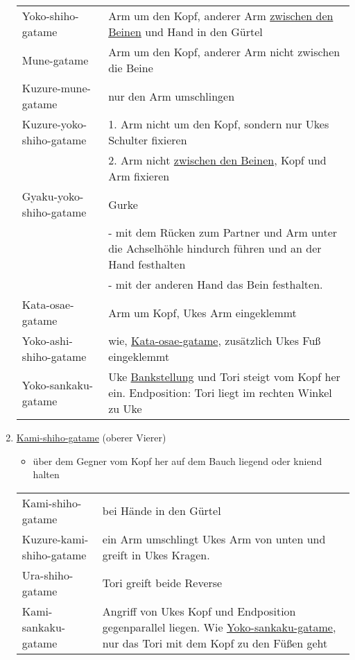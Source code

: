 \documentclass[justified, a4paper, notitlepage, captions=tableheading, nobib]{tufte-handout}
\begin{document}
\begin{enumerate}
\begin{center}
\begin{tabular}{ll}
\label{org5eab229}Yoko-shiho-gatame & Arm um den Kopf, anderer Arm \hyperref[org891f77f]{zwischen den Beinen} und Hand in den Gürtel\\
\label{org671197b}Mune-gatame & Arm um den Kopf, anderer Arm nicht zwischen die Beine\\
\label{org1519daf}Kuzure-mune-gatame & nur den Arm umschlingen\\
\label{org1addcf5}Kuzure-yoko-shiho-gatame & 1. Arm nicht um den Kopf, sondern nur Ukes Schulter fixieren\\
 & 2. Arm nicht \hyperref[org891f77f]{zwischen den Beinen}, Kopf und Arm fixieren\\
\label{orgd632f9b}Gyaku-yoko-shiho-gatame & \label{org297d645}Gurke\\
 & - mit dem Rücken zum Partner und Arm unter die Achselhöhle hindurch führen und an der Hand festhalten\\
 & - mit der anderen Hand das Bein festhalten.\\
\label{orgf24bc8b}Kata-osae-gatame & Arm um Kopf, Ukes Arm eingeklemmt\\
\label{org118e3bf}Yoko-ashi-shiho-gatame & wie, \hyperref[orgf24bc8b]{Kata-osae-gatame}, zusätzlich Ukes Fuß eingeklemmt\\
\label{orgfa4f309}Yoko-sankaku-gatame & Uke \hyperref[orgf15b76f]{Bankstellung} und Tori steigt vom Kopf her ein. Endposition: Tori liegt im rechten Winkel zu Uke\\
\end{tabular}
\end{center}

\item \hyperref[org450423b]{Kami-shiho-gatame} (oberer Vierer)
\label{sec:orgaa82343}

\begin{itemize}
\item über dem Gegner vom Kopf her auf dem Bauch liegend oder kniend halten
\end{itemize}

\begin{center}
\begin{tabular}{ll}
\label{org450423b}Kami-shiho-gatame & bei Hände in den Gürtel\\
\label{orgbc5ae4b}Kuzure-kami-shiho-gatame & ein Arm umschlingt Ukes Arm von unten und greift in Ukes Kragen.\\
\label{orgc459d90}Ura-shiho-gatame & Tori greift beide Reverse\\
\label{orge0f842d}Kami-sankaku-gatame & Angriff von Ukes Kopf und Endposition gegenparallel liegen. Wie \hyperref[orgfa4f309]{Yoko-sankaku-gatame}, nur das Tori mit dem Kopf zu den Füßen geht\\
\end{tabular}
\end{center}


\end{enumerate}
\end{document}
